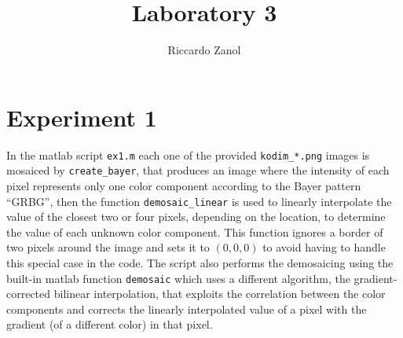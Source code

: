 \documentclass{article}
\author{Riccardo Zanol}
\title{Laboratory 3}
\newcommand{\inlinecode}[1]{\lstinline[basicstyle=\ttfamily,keywordstyle={}]{#1}}
\begin{document}
\maketitle
\section*{Experiment 1}
In the matlab script \inlinecode{ex1.m} each one of the provided
\inlinecode{kodim_*.png} images is mosaiced by
\inlinecode{create_bayer}, that produces an image where the intensity
of each pixel represents only one color component according to the
Bayer pattern ``GRBG'', then the function \inlinecode{demosaic_linear}
is used to linearly interpolate the value of the closest two or four
pixels, depending on the location, to determine the value of each
unknown color component. This function ignores a border of two pixels
around the image and sets it to $(0,0,0)$ to avoid having to handle
this special case in the code.  The script also performs the
demosaicing using the built-in matlab function \inlinecode{demosaic}
which uses a different algorithm, the gradient-corrected bilinear
interpolation, that exploits the correlation between the color
components and corrects the linearly interpolated value of a pixel
with the gradient (of a different color) in that pixel.
\end{document}
